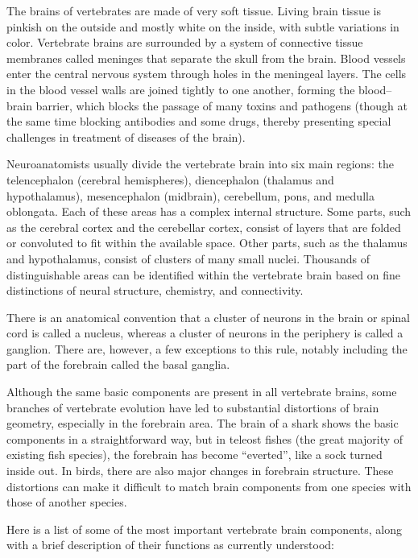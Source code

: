 The brains of vertebrates are made of very soft tissue. Living brain tissue is pinkish on the outside and mostly white on the inside, with subtle variations in color. Vertebrate brains are surrounded by a system of connective tissue membranes called meninges that separate the skull from the brain. Blood vessels enter the central nervous system through holes in the meningeal layers. The cells in the blood vessel walls are joined tightly to one another, forming the blood--brain barrier, which blocks the passage of many toxins and pathogens (though at the same time blocking antibodies and some drugs, thereby presenting special challenges in treatment of diseases of the brain).

Neuroanatomists usually divide the vertebrate brain into six main regions: the telencephalon (cerebral hemispheres), diencephalon (thalamus and hypothalamus), mesencephalon (midbrain), cerebellum, pons, and medulla oblongata. Each of these areas has a complex internal structure. Some parts, such as the cerebral cortex and the cerebellar cortex, consist of layers that are folded or convoluted to fit within the available space. Other parts, such as the thalamus and hypothalamus, consist of clusters of many small nuclei. Thousands of distinguishable areas can be identified within the vertebrate brain based on fine distinctions of neural structure, chemistry, and connectivity.

There is an anatomical convention that a cluster of neurons in the brain or spinal cord is called a nucleus, whereas a cluster of neurons in the periphery is called a ganglion. There are, however, a few exceptions to this rule, notably including the part of the forebrain called the basal ganglia.

Although the same basic components are present in all vertebrate brains, some branches of vertebrate evolution have led to substantial distortions of brain geometry, especially in the forebrain area. The brain of a shark shows the basic components in a straightforward way, but in teleost fishes (the great majority of existing fish species), the forebrain has become ``everted'', like a sock turned inside out. In birds, there are also major changes in forebrain structure. These distortions can make it difficult to match brain components from one species with those of another species.

Here is a list of some of the most important vertebrate brain components, along with a brief description of their functions as currently understood:

